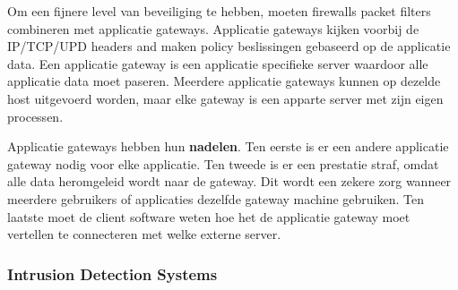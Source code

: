
Om een fijnere level van beveiliging te hebben, moeten firewalls packet filters combineren met applicatie gateways. Applicatie gateways kijken voorbij de IP/TCP/UPD headers and maken policy beslissingen gebaseerd op de applicatie data. Een applicatie gateway is een applicatie specifieke server waardoor alle applicatie data moet paseren. Meerdere applicatie gateways kunnen op dezelde host uitgevoerd worden, maar elke gateway is een apparte server met zijn eigen processen.

Applicatie gateways hebben hun \textbf{nadelen}. Ten eerste is er een andere applicatie gateway nodig voor elke applicatie. Ten tweede is er een prestatie straf, omdat alle data heromgeleid wordt naar de gateway. Dit wordt een zekere zorg wanneer meerdere gebruikers of applicaties dezelfde gateway machine gebruiken. Ten laatste moet de client software weten hoe het de applicatie gateway moet vertellen te connecteren met welke externe server.

\subsubsection{Intrusion Detection Systems}

